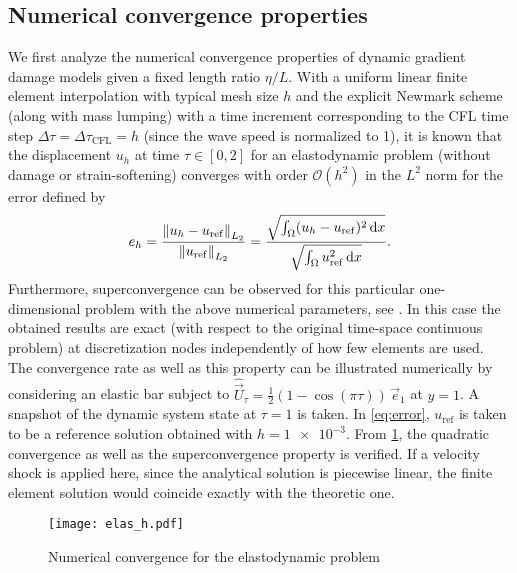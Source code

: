 \subsection{Numerical convergence properties}
We first analyze the numerical convergence properties of dynamic gradient damage models given a fixed length ratio $\eta/L$. With a uniform linear finite element interpolation with typical mesh size $h$ and the explicit Newmark scheme (along with mass lumping) with a time increment corresponding to the CFL time step $\Delta \tau=\Delta \tau_\mathrm{CFL}=h$ (since the wave speed is normalized to 1), it is known that the displacement $u_h$ at time $\tau\in[0,2]$ for an elastodynamic problem (without damage or strain-softening) converges with order $\mathcal{O}(h^2)$ in the $L^2$ norm for the error defined by
\begin{equation} \label{eq:error}
e_h=\frac{\left\lVert{u_h-u_\mathrm{ref}}\right\rVert_{L_2}}{\left\lVert{u_\mathrm{ref}}\right\rVert_{L_2}}=\frac{\sqrt{\int_\Omega(u_h-u_\mathrm{ref})^2\,\mathrm{d}x}}{\sqrt{\int_\Omega u_\mathrm{ref}^2\,\mathrm{d}x}}.
\end{equation}
Furthermore, superconvergence can be observed for this particular one-dimensional problem with the above numerical parameters, see \cite{Hughes:2010}. In this case the obtained results are exact (with respect to the original time-space continuous problem) at discretization nodes independently of how few elements are used. The convergence rate as well as this property can be illustrated numerically by considering an elastic bar subject to $\widehat{\vec{U}}_\tau=\frac{1}{2}(1-\cos(\pi \tau))\,\vec{e}_1$ at $y=1$. A snapshot of the dynamic system state at $\tau=1$ is taken. In \eqref{eq:error}, $u_\mathrm{ref}$ is taken to be a reference solution obtained with $h=\num{1e-3}$. From \cref{fig:elasconv}, the quadratic convergence as well as the superconvergence property is verified. If a velocity shock is applied here, since the analytical solution is piecewise linear, the finite element solution would coincide exactly with the theoretic one.
\begin{figure}[htbp]
\centering
\texttt{[image: elas\_h.pdf]}
\caption{Numerical convergence for the elastodynamic problem} \label{fig:elasconv}
\end{figure}

